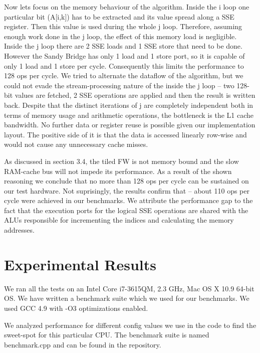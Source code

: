 \documentclass[letterpaper]{article}
\newcommand{\erik}[1]{\textcolor{blue}{[Erik: #1]}}
\begin{document}
Now lets focus on the memory behaviour of the algorithm. Inside the i loop one particular bit (A[i,k]) has to be extracted and its value spread along a SSE register. Then this value is 
used during the whole j loop. Therefore, assuming enough work done in the j loop, the effect of this memory load is negligible. 
Inside the j loop there are 2 SSE loads and 1 SSE store that need to be done. However the Sandy Bridge has only 1 load and 1 store port, so it is capable of
only 1 load and 1 store per cycle. Consequently this limits the performance to 128 ops per cycle. We tried to alternate the dataflow of the algorithm, but we could not
evade the stream-processing nature of the inside the j loop -- two 128-bit values are fetched, 2 SSE operations are applied and then the result is written back. 
Despite that the distinct iterations of j are completely independent both in terms of memory usage and arithmetic operations, the 
bottleneck is the L1 cache bandwidth. No further data or register reuse is possible given our implementation layout. The positive side of it is that the data is accessed 
linearly row-wise and would not cause any unnecessary cache misses.

As discussed in section 3.4, the tiled FW is not memory bound and the slow RAM-cache bus will not impede its performance. As a result of the shown reasoning we conclude that no more than 
128 ops per cycle can be sustained on our test hardware. Not suprisingly, the results confirm that -- about 110 ops per cycle were achieved in our benchmarks. We attribute the performance gap to the fact that 
the execution ports for the logical SSE operations are shared with the ALUs responsible for incrementing the indices and calculating the memory addresses.

\section{Experimental Results}\label{sec:exp}
We ran all the tests on an Intel Core i7-3615QM, 2.3 GHz, Mac OS X 10.9 64-bit OS. We have written a benchmark suite which we used for our benchmarks. We used GCC 4.9 with \textsf{-O3} optimizations enabled.

We analyzed performance for different config values we use in the code to find the sweet-spot for this particular CPU. The benchmark suite is named \textsf{benchmark.cpp} and can be found in the repository. 
\end{document}
